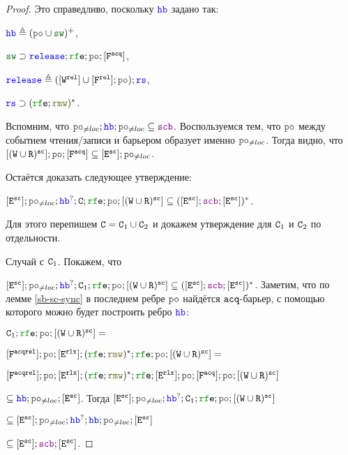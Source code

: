 \begin{proof}
  
  \canceloffset Это справедливо, поскольку $\lHB$ задано так: 

  $\lHB \defeq (\lPO \cup \lSW)^{+}$,

  $\lSW \supset \mathtt{\color{blue}release};\lRFE;\lPO;[\lF^{\acq}]$,

  $\mathtt{\color{blue}release} \defeq ([\lW^{\rel}] \cup [\lF^{\rel}];\lPO);\mathtt{\color{blue}rs}$,

  $\mathtt{\color{blue}rs} \supset (\lRFE;\lRMW)^{*}$.

  Вспомним, что $\lPO_{\neq loc} ; \lHB ; \lPO_{\neq loc} \subseteq \lSCB$. Воспользуемся тем, что $\lPO$ между событием чтения/записи и барьером образует именно $\lPO_{\neq loc}$. Тогда видно, что $[(\lW \cup \lR)^{\sco}]; \lPO; [\lF^{\acq}] \subseteq [\lE^{\sco}]; \lPO_{\neq loc}$.

  Остаётся доказать следующее утверждение:

  $[\lE^{\sco}]; \lPO_{\neq loc} ; \lHB^?; \CA; \lRFE; \lPO ; [(\lW \cup \lR)^{\sco}] \subseteq  ([\lE^{\sco}] ; \lSCB ; [\lE^{\sco}])^{*}$.

  Для этого перепишем $\mathtt{C}=\mathtt{C}_1 \cup \mathtt{C}_2$ и докажем утверждение для $\mathtt{C}_1$ и $\mathtt{C}_2$ по отдельности. 

  
  Случай с $\mathtt{C}_1$. Покажем, что

  $[\lE^{\sco}]; \lPO_{\neq loc} ; \lHB^?; \CA_1; \lRFE; \lPO ; [(\lW \cup \lR)^{\sco}]\subseteq  ([\lE^{\sco}] ; \lSCB ; [\lE^{\sco}])^{*}$.
Заметим, что по лемме \ref{sb-sc-sync}   в последнем ребре $\lPO$ найдётся ${\mathtt{acq}}$-барьер, с помощью которого можно будет построить ребро $\lHB$:

\noindent $\CA_1; \lRFE; \lPO ; [(\lW \cup \lR)^{\sco}] =$

\noindent $[\Far] ; \lPO ; [\lE^{\rlx}] ; (\lRFE ; \lRMW)^{*}; \lRFE; \lPO ; [(\lW \cup \lR)^{\sco}]=$

\noindent $[\Far] ; \lPO ; [\lE^{\rlx}] ; (\lRFE ; \lRMW)^{*}; \lRFE; [\lE^{\rlx}]; \lPO; [\Fa]; \lPO ; [(\lW \cup \lR)^{\sco}]$

\noindent $\subseteq \lHB; \lPO_{\neq loc}; [\lE^{\sco}]$.  Тогда $[\lE^{\sco}]; \lPO_{\neq loc} ; \lHB^?; \CA_1; \lRFE; \lPO ; [(\lW \cup \lR)^{\sco}]$

\noindent $\subseteq [\lE^{\sco}]; \lPO_{\neq loc} ; \lHB^?; \lHB; \lPO_{\neq loc}; [\lE^{\sco}]$

\noindent $\subseteq [\lE^{\sco}] ; \lSCB ; [\lE^{\sco}]$.

    \vspace{1em}
    

\end{proof}
